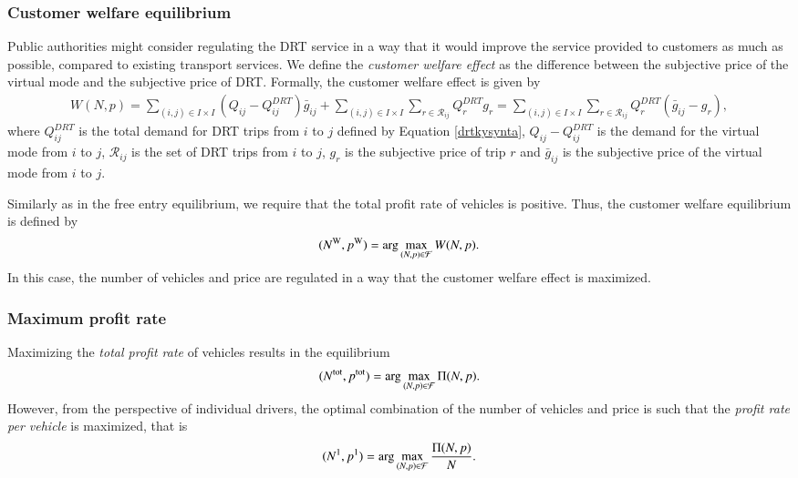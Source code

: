 \documentclass[dissertation,draft*]{aaltoseries}
\begin{document}
\subsubsection{Customer welfare equilibrium}
Public authorities might consider regulating the DRT service in a way that it would
improve the service provided to customers as much as possible, compared
to existing transport services. We define the \emph{customer welfare effect}
as the difference between the subjective price of the virtual mode and 
the subjective price of DRT. Formally, the customer welfare effect is given by
\begin{align}
W(N,p) = \sum_{(i,j) \in I \times I} \left(Q_{ij} - Q^{DRT}_{ij}\right) \bar{g}_{ij} 
+ \sum_{(i,j) \in I \times I} \sum_{r \in \mathcal{R}_{ij}} Q^{DRT}_r  g_r = 
\sum_{(i,j) \in I \times I} \sum_{r \in \mathcal{R}_{ij}} Q^{DRT}_r  (\bar{g}_{ij}-g_r),
\end{align}
where $Q^{DRT}_{ij}$ is the total demand for DRT trips from $i$ to $j$ defined by Equation \eqref{drtkysynta},
$Q_{ij} - Q^{DRT}_{ij}$ is the demand for the virtual mode from $i$ to $j$, $\mathcal{R}_{ij}$
is the set of DRT trips from $i$ to $j$, $g_r$ is the subjective price
of trip $r$ and $\bar{g}_{ij}$ is the subjective price of the virtual mode from $i$ to $j$.

Similarly as in the free entry equilibrium, we require that the total profit rate of
vehicles is positive. Thus, the customer welfare equilibrium is defined by 
\begin{align}
\label{welfare}
(N^{\rm W},p^{\rm W}) = \arg \max_{(N,p) \in \mathcal{F}} W(N,p). 
\end{align}
In this case, the number of vehicles and price are regulated in a way that the 
customer welfare effect is maximized.

\subsubsection{Maximum profit rate}
Maximizing the \emph{total profit rate} of vehicles results in the equilibrium
\begin{align}
\label{totalprofit}
(N^{\rm tot},p^{\rm tot}) = \arg \max_{(N,p) \in \mathcal{F}} \Pi(N,p). 
\end{align}
However, from the perspective of individual drivers, the optimal combination of the
number of vehicles and price is such that the \emph{profit rate per vehicle}
is maximized, that is 
\begin{align}
\label{pervehicle}
(N^{\rm 1},p^{\rm 1}) = \arg \max_{(N,p) \in \mathcal{F}} \frac{\Pi(N,p)}{N}. 
\end{align}
 
\end{document}
